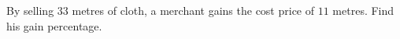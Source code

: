 By selling $33$ metres of cloth, a merchant gains the cost price of $11$ metres. Find his gain percentage.
